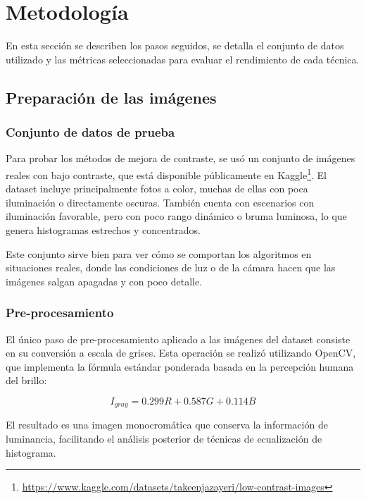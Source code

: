\documentclass[sigchi]{acmart}
\begin{document}
\section{Metodología}
\label{sec:metodologia}

En esta sección se describen los pasos seguidos, se detalla el conjunto de datos utilizado y
las métricas seleccionadas para evaluar el rendimiento de cada técnica.

\subsection{Preparación de las imágenes}
\label{subsec:preparacion}

\subsubsection{Conjunto de datos de prueba}

Para probar los métodos de mejora de contraste, se usó un conjunto de imágenes reales con bajo
contraste, que está disponible públicamente en
Kaggle\footnote{\url{https://www.kaggle.com/datasets/takeenjazayeri/low-contrast-images}}. El
dataset incluye principalmente fotos a color, muchas de ellas con poca iluminación o
directamente oscuras. También cuenta con escenarios con iluminación favorable, pero con poco
rango dinámico o bruma luminosa, lo que genera histogramas estrechos y concentrados.

Este conjunto sirve bien para ver cómo se comportan los algoritmos en situaciones reales, donde
las condiciones de luz o de la cámara hacen que las imágenes salgan apagadas y con poco
detalle.

\subsubsection{Pre-procesamiento}

El único paso de pre-procesamiento aplicado a las imágenes del dataset consiste en su
conversión a escala de grises. Esta operación se realizó utilizando OpenCV, que implementa la
fórmula estándar ponderada basada en la percepción humana del brillo:

\begin{equation}
	I_{gray} = 0.299R + 0.587G + 0.114B
\end{equation}

El resultado es una imagen monocromática que conserva la información de luminancia, facilitando
el análisis posterior de técnicas de ecualización de histograma.
\end{document}
